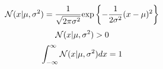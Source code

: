 $${\cal N}(x|\mu, \sigma ^{2})=\frac{1}{\sqrt{2\pi \sigma ^{2}}}{\rm exp}\left\{ -\frac{1}{2\sigma ^{2}}{(x-\mu)^{2}} \right\} $$
$${\cal N}(x|\mu, \sigma ^{2}) > 0$$
$$\int_{-\infty}^{\infty}{{\cal N}(x|\mu, \sigma ^{2})dx} = 1$$
